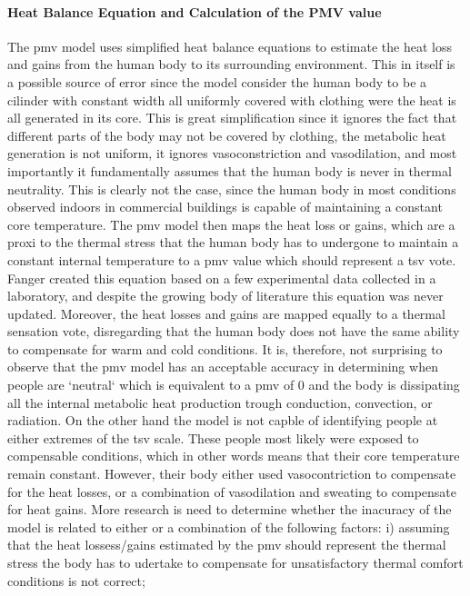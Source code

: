 \paragraph{Heat Balance Equation and Calculation of the PMV value}
 The \ac{pmv} model uses simplified heat balance equations to estimate the heat loss and gains from the human body to its surrounding environment.
This in itself is a possible source of error since the model consider the human body to be a cilinder with constant width all uniformly covered with clothing were the heat is all generated in its core.
This is great simplification since it ignores the fact that different parts of the body may not be covered by clothing, the metabolic heat generation is not uniform, it ignores vasoconstriction and vasodilation, and most importantly it fundamentally assumes that the human body is never in thermal neutrality.
This is clearly not the case, since the human body in most conditions observed indoors in commercial buildings is capable of maintaining a constant core temperature.
The \ac{pmv} model then maps the heat loss or gains, which are a proxi to the thermal stress that the human body has to undergone to maintain a constant internal temperature to a \ac{pmv} value which should represent a \ac{tsv} vote.
Fanger created this equation based on a few experimental data collected in a laboratory, and despite the growing body of literature this equation was never updated.
Moreover, the heat losses and gains are mapped equally to a thermal sensation vote, disregarding that the human body does not have the same ability to compensate for warm and cold conditions.
It is, therefore, not surprising to observe that the \ac{pmv} model has an acceptable accuracy in determining when people are `neutral` which is equivalent to a \ac{pmv} of 0 and the body is dissipating all the internal metabolic heat production trough conduction, convection, or radiation.
On the other hand the model is not capble of identifying people at either extremes of the \ac{tsv} scale.
These people most likely were exposed to compensable conditions, which in other words means that their core temperature remain constant.
However, their body either used vasocontriction to compensate for the heat losses, or a combination of vasodilation and sweating to compensate for heat gains.
More research is need to determine whether the inacuracy of the model is related to either or a combination of the following factors: i) assuming that the heat lossess/gains estimated by the \ac{pmv} should represent the thermal stress the body has to udertake to compensate for unsatisfactory thermal comfort conditions is not correct;
